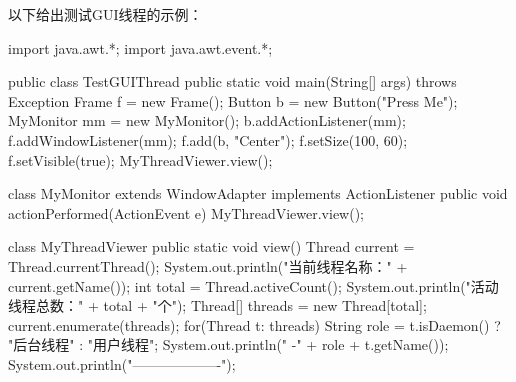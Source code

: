 以下给出测试GUI线程的示例：


\begin{javaCode}
import java.awt.*;
import java.awt.event.*;

public class TestGUIThread {
  public static void main(String[] args) throws Exception {
    Frame f = new Frame();
    Button b = new Button("Press Me");
    MyMonitor mm = new MyMonitor();
    b.addActionListener(mm);
    f.addWindowListener(mm);
    f.add(b, "Center");
    f.setSize(100, 60);
    f.setVisible(true);
    MyThreadViewer.view();
  }
}

class MyMonitor extends WindowAdapter implements ActionListener {
  public void actionPerformed(ActionEvent e) {
    MyThreadViewer.view();
  }
}

class MyThreadViewer {
  public static void view() {
    Thread current = Thread.currentThread();
    System.out.println("当前线程名称：" + current.getName());
    int total = Thread.activeCount();
    System.out.println("活动线程总数：" + total + "个");
    Thread[] threads = new Thread[total];
    current.enumerate(threads);
    for(Thread t: threads) {
      String role = t.isDaemon() ? "后台线程" : "用户线程";
      System.out.println("   -" + role + t.getName());
    }
    System.out.println("-------------------");
  }
}
\end{javaCode}



